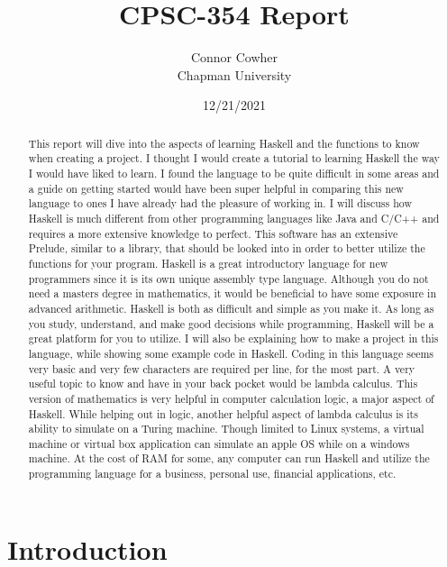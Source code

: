 \documentclass{article}
\title{CPSC-354 Report}
\author{Connor Cowher \\ Chapman University}
\date{12/21/2021}
\begin{document}
\maketitle

\begin{abstract}
This report will dive into the aspects of learning Haskell and the functions to know when creating a project. I thought I would create a tutorial to learning Haskell the way I would have liked to learn. I found the language to be quite difficult in some areas and a guide on getting started would have been super helpful in comparing this new language to ones I have already had the pleasure of working in. I will discuss how Haskell is much different from other programming languages like Java and C/C++ and requires a more extensive knowledge to perfect. This software has an extensive Prelude, similar to a library, that should be looked into in order to better utilize the functions for your program. Haskell is a great introductory language for new programmers since it is its own unique assembly type language. Although you do not need a masters degree in mathematics, it would be beneficial to have some exposure in advanced arithmetic. Haskell is both as difficult and simple as you make it. As long as you study, understand, and make good decisions while programming, Haskell will be a great platform for you to utilize. I will also be explaining how to make a project in this language, while showing some example code in Haskell. Coding in this language seems very basic and very few characters are required per line, for the most part. A very useful topic to know and have in your back pocket would be lambda calculus. This version of mathematics is very helpful in computer calculation logic, a major aspect of Haskell. While helping out in logic, another helpful aspect of lambda calculus is its ability to simulate on a Turing machine. Though limited to Linux systems, a virtual machine or virtual box application can simulate an apple OS while on a windows machine. At the cost of RAM for some, any computer can run Haskell and utilize the programming language for a business, personal use, financial applications, etc. 
\clearpage
\end{abstract}

\tableofcontents
\clearpage

\section{Introduction}\label{intro} 
\end{document}
